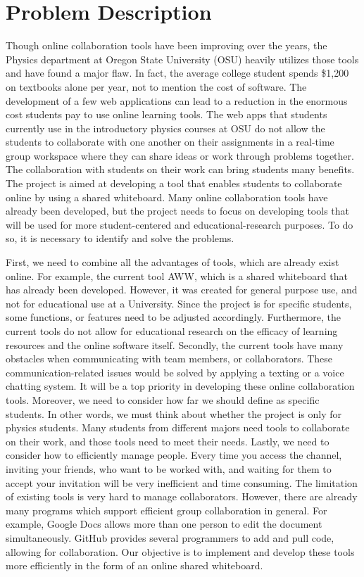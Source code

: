 \documentclass[onecolumn, draftclsnofoot,10pt, compsoc]{IEEEtran}
\begin{document}
\section{Problem Description}
Though online collaboration tools have been improving over the years, the Physics department at Oregon State University (OSU) heavily utilizes those tools and have found a major flaw. In fact, the average college student spends \$1,200 on textbooks alone per year\cite{costBooks}, not to mention the cost of software. The development of a few web applications can lead to a reduction in the enormous cost students pay to use online learning tools. The web apps that students currently use in the introductory physics courses at OSU do not allow the students to collaborate with one another on their assignments in a real-time group workspace where they can share ideas or work through problems together. The collaboration with students on their work can bring students many benefits. The project is aimed at developing a tool that enables students to collaborate online by using a shared whiteboard. Many online collaboration tools have already been developed, but the project needs to focus on developing tools that will be used for more student-centered and educational-research purposes. To do so, it is necessary to identify and solve the problems.

First, we need to combine all the advantages of tools, which are already exist online. For example, the current tool AWW, which is a shared whiteboard that has already been developed. However, it was created for general purpose use, and not for educational use at a University. Since the project is for specific students, some functions, or features need to be adjusted accordingly. Furthermore, the current tools do not allow for educational research on the efficacy of learning resources and the online software itself. Secondly, the current tools have many obstacles when communicating with team members, or collaborators. These communication-related issues would be solved by applying a texting or a voice chatting system. It will be a top priority in developing these online collaboration tools. Moreover, we need to consider how far we should define as specific students. In other words, we must think about whether the project is only for physics students. Many students from different majors need tools to collaborate on their work, and those tools need to meet their needs. Lastly, we need to consider how to efficiently manage people. Every time you access the channel, inviting your friends, who want to be worked with, and waiting for them to accept your invitation will be very inefficient and time consuming. The limitation of existing tools is very hard to manage collaborators. However, there are already many programs which support efficient group collaboration in general. For example, Google Docs allows more than one person to edit the document simultaneously. GitHub provides several programmers to add and pull code, allowing for collaboration. Our objective is to implement and develop these tools more efficiently in the form of an online shared whiteboard.
\end{document}
